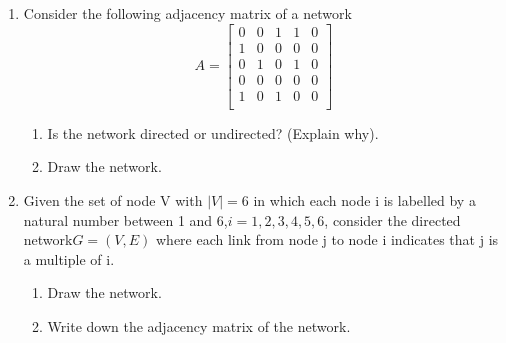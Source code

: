 \documentclass{amsart}
\theoremstyle{definition}
\theoremstyle{remark}
\numberwithin{equation}{section}
\begin{document}
\clearpage
\begin{enumerate}

\item Consider the following adjacency matrix of a network
\begin{equation*}
{A}  = \left\lbrack\begin{array}{ccccc}
0 & 0 & 1& 1& 0 \\
1 & 0 & 0& 0& 0 \\
0 & 1 & 0& 1& 0 \\
0 & 0 & 0& 0& 0 \\
1& 0 & 1& 0& 0 \\
\end{array}\right\rbrack
\end{equation*}

\begin{enumerate}
\item Is the network directed or undirected? (Explain why).
\item Draw the network.
\end{enumerate}

\vspace{5cm}

\item Given the set of node V with $|V | = 6$ in which each node i is labelled by
a natural number between 1 and 6,$ i = 1, 2, 3, 4, 5, 6$, consider the directed
network$ G = (V, E)$ where each link from node j to node i indicates that
j is a multiple of i.
\begin{enumerate}
\item Draw the network.
\item Write down the adjacency matrix of the network.
\end{enumerate}

\clearpage


\end{enumerate}
\end{document}
